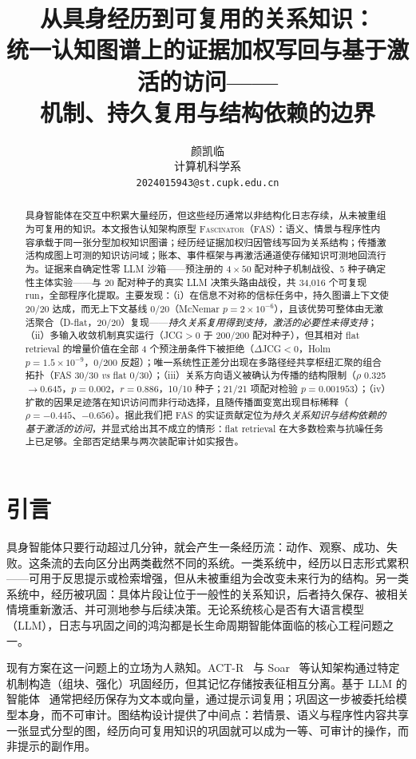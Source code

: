 \documentclass[10pt,a4paper]{ctexart}
\title{\bfseries 从具身经历到可复用的关系知识：\\ 统一认知图谱上的证据加权写回与基于激活的访问——\\ 机制、持久复用与结构依赖的边界}
\author{颜凯临\\ \small 计算机科学系\\ \small \texttt{2024015943@st.cupk.edu.cn}}
\date{}
\begin{document}
\maketitle

\begin{abstract}
具身智能体在交互中积累大量经历，但这些经历通常以非结构化日志存续，从未被重组为可复用的知识。本文报告认知架构原型 \textsc{Fascinator}（FAS）：语义、情景与程序性内容承载于同一张分型加权知识图谱；经历经证据加权归因管线写回为关系结构；传播激活构成图上可测的知识访问域；账本、事件框架与再激活通道使存储知识可测地回流行为。证据来自确定性零 LLM 沙箱——预注册的 $4\times50$ 配对种子机制战役、5 种子确定性主体实验——与 20 配对种子的真实 LLM 决策头路由战役，共 34{,}016 个可复现 run，全部程序化提取。主要发现：（i）在信息不对称的信标任务中，持久图谱上下文使 20/20 达成，而无上下文基线 0/20（McNemar $p{=}2\times10^{-6}$），且该优势可整体由无激活聚合（D-flat，20/20）复现——\emph{持久关系复用得到支持，激活的必要性未得支持}；（ii）多输入收敛机制真实运行（JCG$>{0}$ 于 200/200 配对种子），但其相对 flat retrieval 的增量价值在全部 4 个预注册条件下被拒绝（$\Delta$JCG${<}0$，Holm $p{=}1.5\times10^{-9}$，0/200 反超）；唯一系统性正差分出现在多路径经共享枢纽汇聚的组合拓扑（FAS 30/30 \emph{vs} flat 0/30）；（iii）关系方向语义被确认为传播的结构限制（$\rho$ 0.325$\rightarrow$0.645，$p{=}0.002$，$r{=}0.886$，10/10 种子；21/21 项配对检验 $p{=}0.001953$）；（iv）扩散的因果足迹落在知识访问而非行动选择，且随传播面变宽出现目标稀释（$\rho{=}{-}0.445$、${-}0.656$）。据此我们把 FAS 的实证贡献定位为\emph{持久关系知识与结构依赖的基于激活的访问}，并显式给出其不成立的情形：flat retrieval 在大多数检索与抗噪任务上已足够。全部否定结果与两次装配审计如实报告。
\end{abstract}

\section{引言}
\label{sec:intro}

具身智能体只要行动超过几分钟，就会产生一条经历流：动作、观察、成功、失败。这条流的去向区分出两类截然不同的系统。一类系统中，经历以日志形式累积——可用于反思提示或检索增强，但从未被重组为会改变未来行为的结构。另一类系统中，经历被巩固：具体片段让位于一般性的关系知识，后者持久保存、被相关情境重新激活、并可测地参与后续决策。无论系统核心是否有大语言模型（LLM），日志与巩固之间的鸿沟都是长生命周期智能体面临的核心工程问题之一。

现有方案在这一问题上的立场为人熟知。ACT-R~\citep{anderson2004integrated} 与 Soar~\citep{laird2012soar} 等认知架构通过特定机制构造（组块、强化）巩固经历，但其记忆存储按表征相互分离。基于 LLM 的智能体~\citep{yao2023react,park2023generative,shinn2023reflexion} 通常把经历保存为文本或向量，通过提示词复用；巩固这一步被委托给模型本身，而不可审计。图结构设计提供了中间点：若情景、语义与程序性内容共享一张显式分型的图，经历向可复用知识的巩固就可以成为一等、可审计的操作，而非提示的副作用。
\end{document}
